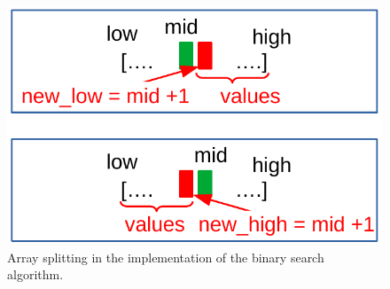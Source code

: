 \begin{figure}[H]
	\begin{center}
		\includegraphics[scale=.6]{chapters/searchandsorting/images/sorting_3.pdf}
		\caption[Array splitting in the implementation of the binary search algorithm.]{Array splitting in the implementation of the binary search algorithm.}
		\label{sorting_3}
	\end{center}
\end{figure}

